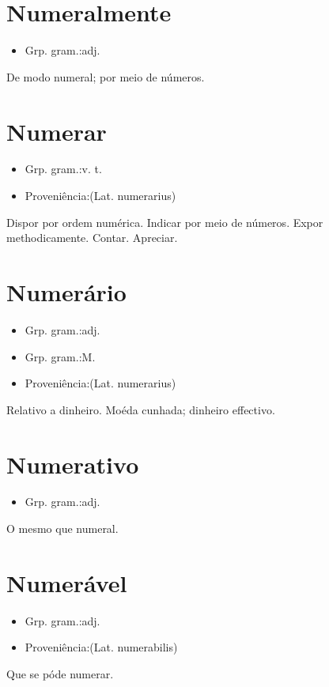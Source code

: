 \section{Numeralmente}
\begin{itemize}
\item {Grp. gram.:adj.}
\end{itemize}
De modo numeral; por meio de números.
\section{Numerar}
\begin{itemize}
\item {Grp. gram.:v. t.}
\end{itemize}
\begin{itemize}
\item {Proveniência:(Lat. \textunderscore numerarius\textunderscore )}
\end{itemize}
Dispor por ordem numérica.
Indicar por meio de números.
Expor methodicamente.
Contar.
Apreciar.
\section{Numerário}
\begin{itemize}
\item {Grp. gram.:adj.}
\end{itemize}
\begin{itemize}
\item {Grp. gram.:M.}
\end{itemize}
\begin{itemize}
\item {Proveniência:(Lat. \textunderscore numerarius\textunderscore )}
\end{itemize}
Relativo a dinheiro.
Moéda cunhada; dinheiro effectivo.
\section{Numerativo}
\begin{itemize}
\item {Grp. gram.:adj.}
\end{itemize}
O mesmo que \textunderscore numeral\textunderscore .
\section{Numerável}
\begin{itemize}
\item {Grp. gram.:adj.}
\end{itemize}
\begin{itemize}
\item {Proveniência:(Lat. \textunderscore numerabilis\textunderscore )}
\end{itemize}
Que se póde numerar.

